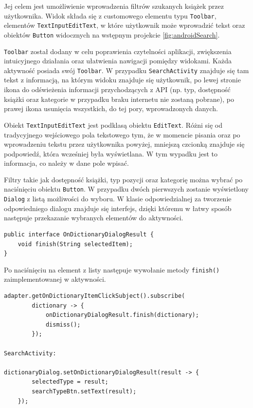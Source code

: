 \documentclass[twoside]{projektInzynierskiMS}
\begin{document}
Jej celem jest umożliwienie wprowadzenia filtrów szukanych książek przez użytkownika. Widok składa się z customowego elementu typu \verb`Toolbar`, elementów \verb`TextInputEditText`, w które użytkownik może wprowadzić tekst oraz obiektów \verb`Button` widocznych na wstępnym projekcie \ref{fig:androidSearch}.

\verb`Toolbar` został dodany w celu poprawienia czytelności aplikacji, zwiększenia intuicyjnego działania oraz ułatwienia nawigacji pomiędzy widokami. Każda aktywność posiada swój \verb`Toolbar`. W przypadku \verb`SearchActivity` znajduje się tam tekst z informacją, na którym widoku znajduje się użytkownik, po lewej stronie ikona do odświeżenia informacji przychodzących z API (np. typ, dostępność książki oraz kategorie w przypadku braku internetu nie zostaną pobrane), po prawej ikona usunięcia wszystkich, do tej pory, wprowadzonych danych. 

Obiekt \verb`TextInputEditText` \cite{textInputEditText} jest podklasą obiektu \verb`EditText`. Różni się od tradycyjnego wejściowego pola tekstowego tym, że w momencie pisania oraz po wprowadzeniu tekstu przez użytkownika powyżej, mniejszą czcionką znajduje się podpowiedź, która wcześniej była wyświetlana. W tym wypadku jest to informacja, co należy w dane pole wpisać.

Filtry takie jak dostępność książki, typ pozycji oraz kategorię można wybrać po naciśnięciu obiektu \verb`Button`. W przypadku dwóch pierwszych zostanie wyświetlony \verb`Dialog` z listą możliwości do wyboru. W klasie odpowiedzialnej za tworzenie odpowiedniego dialogu znajduje się interfejs, dzięki któremu w łatwy sposób następuje przekazanie wybranych elementów do aktywności.
\begin{verbatim}
public interface OnDictionaryDialogResult {
    void finish(String selectedItem);
}
\end{verbatim} 

Po naciśnięciu na element z listy następuje wywołanie metody \verb`finish()` zaimplementowanej w aktywności.
\begin{verbatim}
adapter.getOnDictionaryItemClickSubject().subscribe(
        dictionary -> {
            onDictionaryDialogResult.finish(dictionary);
            dismiss();
        });

SearchActivity:

dictionaryDialog.setOnDictionaryDialogResult(result -> {
        selectedType = result;
        searchTypeBtn.setText(result);
    });
\end{verbatim} 
\end{document}
